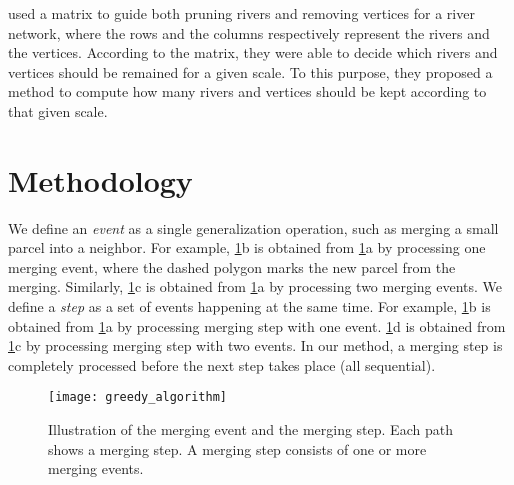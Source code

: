 \documentclass[ijgi,article,submit,moreauthors,pdftex]{Definitions/mdpi}
\begin{document}
\citet{Huang2017Matrix} used a matrix to guide 
both pruning rivers and removing vertices for a river network, 
where the rows and the columns respectively represent
the rivers and the vertices.
According to the matrix, 
they were able to decide which rivers and vertices 
should be remained for a given scale.
To this purpose, they proposed a method 
to compute how many rivers and vertices 
should be kept according to that given scale.







%

\section{Methodology}
\label{sec:methodology}


We define an \emph{event} as a single generalization operation, 
such as merging a small parcel into a neighbor.
For example, \fig\ref{fig:event_and_step}b is obtained from 
\fig\ref{fig:event_and_step}a by processing one merging event,
where the dashed polygon marks the new parcel from the merging.
Similarly, \fig\ref{fig:event_and_step}c is obtained from 
\fig\ref{fig:event_and_step}a by processing two merging events.
We define a \emph{step} as 
a set of events happening at the same time.
For example, 
\fig\ref{fig:event_and_step}b is obtained from 
\fig\ref{fig:event_and_step}a by processing merging step with one event.
\fig\ref{fig:event_and_step}d is obtained from 
\fig\ref{fig:event_and_step}c by processing merging step with two events.
In our method, a merging step is completely processed 
before the next step takes place (all sequential). 

\begin{figure}[tb]
\centering
\texttt{[image: greedy\_algorithm]}
\caption{Illustration of the merging event and the merging step. 
Each path shows a merging step. 
A merging step consists of one or more merging events.}
\label{fig:event_and_step}
\end{figure}
\end{document}
